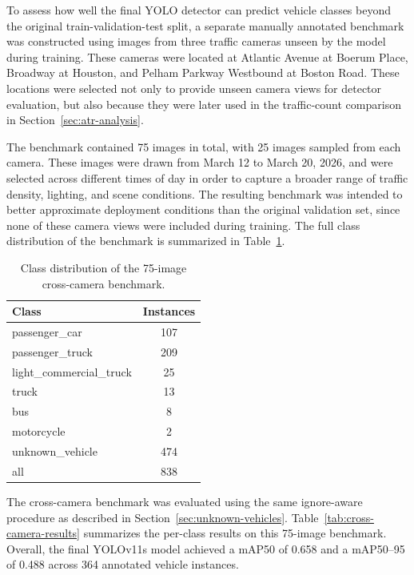 To assess how well the final YOLO detector can predict vehicle classes beyond the 
original train-validation-test split, a separate manually annotated benchmark was 
constructed using images from three traffic cameras unseen by the model during 
training. These cameras were located at Atlantic Avenue at Boerum Place, Broadway
at Houston, and Pelham Parkway Westbound at Boston Road. These locations were 
selected not only to provide unseen camera views for detector evaluation, but also
because they were later used in the traffic-count comparison in Section~\ref{sec:atr-analysis}.

The benchmark contained 75 images in total, with 25 images sampled from each camera. 
These images were drawn from March 12 to March 20, 2026, and were selected across 
different times of day in order to capture a broader range of traffic density, 
lighting, and scene conditions. The resulting benchmark was intended to better 
approximate deployment conditions than the original validation set, since none of
these camera views were included during training. The full class distribution of 
the benchmark is summarized in Table~\ref{tab:cross-camera-benchmark-class-counts}.

\begin{table}[!htbp]
    \centering
    \caption{Class distribution of the 75-image cross-camera benchmark.}
    \label{tab:cross-camera-benchmark-class-counts}
    \begin{tabular}{l c}
        \toprule
        Class & Instances \\
        \midrule
        passenger\_car            & 107 \\
        passenger\_truck          & 209 \\
        light\_commercial\_truck  & 25  \\
        truck                     & 13  \\
        bus                       & 8   \\
        motorcycle                & 2   \\
        unknown\_vehicle          & 474 \\
        \midrule
        all                       & 838 \\
        \bottomrule
    \end{tabular}
\end{table}
\FloatBarrier

The cross-camera benchmark was evaluated using the same ignore-aware procedure as 
described in Section~\ref{sec:unknown-vehicles}. Table~\ref{tab:cross-camera-results}
summarizes the per-class results on this 75-image benchmark. Overall, the final 
YOLOv11s model achieved a mAP50 of 0.658 and a mAP50--95 of 0.488 across 364 annotated 
vehicle instances.

